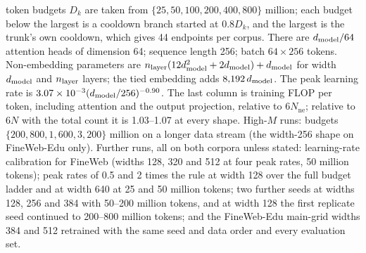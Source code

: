 \begin{table}[tp]
\begin{tablenotes}
token budgets $D_k$ are taken from $\{25,50,100,200,400,800\}$ million; each budget below the largest is a cooldown
branch started at $0.8D_k$, and the largest is the trunk's own cooldown, which gives 44 endpoints per corpus. There are $d_{\rm model}/64$ attention heads of dimension 64; sequence length 256; batch $64\times256$ tokens.
Non-embedding parameters are $n_{\rm layer}(12d_{\rm model}^2+2d_{\rm model})+d_{\rm model}$ for width $d_{\rm model}$ and $n_{\rm layer}$ layers; the tied embedding adds $8{,}192\,d_{\rm model}$. The
peak learning rate is $3.07\times10^{-3}(d_{\rm model}/256)^{-0.90}$. The last column is training FLOP per token, including
attention and the output projection, relative to $6N_{\mathrm{ne}}$; relative to $6N$ with the total count it is
1.03--1.07 at every shape. High-$M$ runs: budgets $\{200,800,1{,}600,3{,}200\}$ million on a longer data stream (the
width-256 shape on FineWeb-Edu only). Further runs, all on both corpora unless stated: learning-rate calibration for
FineWeb (widths 128, 320 and 512 at four peak rates, 50 million tokens); peak rates of 0.5 and 2 times the rule at
width 128 over the full budget ladder and at width 640 at 25 and 50 million tokens; two further seeds at widths 128,
256 and 384 with 50--200 million tokens, and at width 128 the first replicate seed continued to 200--800 million tokens;
and the FineWeb-Edu main-grid widths 384 and 512 retrained with the same seed and data order and every evaluation set.
\end{tablenotes}
\end{table}
